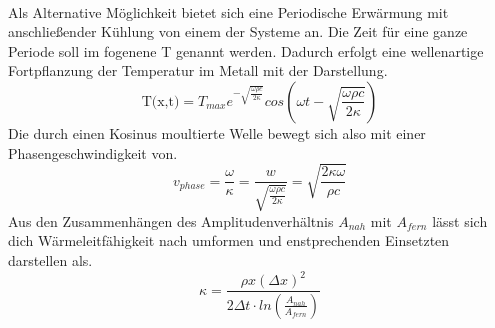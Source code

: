 \\
\newline
Als Alternative Möglichkeit bietet sich eine Periodische Erwärmung mit anschließender Kühlung von einem der Systeme an.
Die Zeit für eine ganze Periode soll im fogenene T genannt werden.
Dadurch erfolgt eine wellenartige Fortpflanzung der Temperatur im Metall mit der Darstellung.
\begin{equation}
    \label{eqn:nqe}
    \text{T(x,t)}=T_{max}e^{- \sqrt{\frac{\omega \rho c}{2 \kappa}}}cos \left (\omega t - \sqrt{\frac{\omega \rho c}{2 \kappa}} \right)
\end{equation}
Die durch einen Kosinus moultierte Welle bewegt sich also mit einer Phasengeschwindigkeit von.
\begin{equation}
    \label{eqn:v}
    v_{phase}= \frac{\omega}{\kappa} = \frac{w}{\sqrt{\frac{\omega \rho c}{2 \kappa}}} = \sqrt{\frac{2\kappa \omega}{\rho c}}
\end{equation}
Aus den Zusammenhängen des Amplitudenverhältnis $A_{nah}$ mit $A_{fern}$ lässt sich dich Wärmeleitfähigkeit nach umformen
und enstprechenden Einsetzten darstellen als.
\begin{equation}
    \label{eqn:kappa}
    \kappa = \frac{\rho x \left ( \Delta x \right )^2}{2 \Delta t \cdot ln \left (\frac{A_{nah}}{A_{fern}}\right)}
\end{equation}